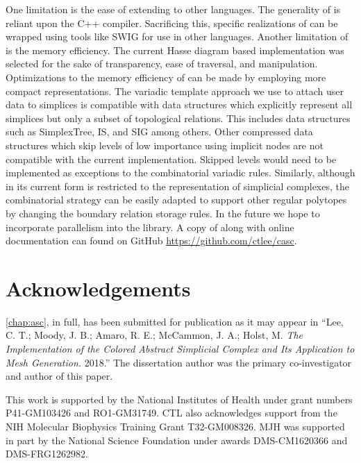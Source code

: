 \par One limitation is the ease of extending to other languages.
The generality of \asc is reliant upon the C++ compiler.
Sacrificing this, specific realizations of \asc can be wrapped using tools like SWIG for use in other languages.
Another limitation of \asc is the memory efficiency.
The current Hasse diagram based implementation was selected for the sake of transparency, ease of traversal, and manipulation.
Optimizations to the memory efficiency of \asc can be made by employing more compact representations.
The variadic template approach we use to attach user data to simplices is compatible with data structures which explicitly represent all simplices but only a subset of topological relations.
This includes data structures such as SimplexTree\cite{Boissonnat2012}, IS\cite{DeFloriani2010b}, and SIG\cite{DeFloriani2004} among others.
Other compressed data structures which skip levels of low importance using implicit nodes are not compatible with the current \asc implementation.
Skipped levels would need to be implemented as exceptions to the combinatorial variadic rules.
Similarly, although \asc in its current form is restricted to the representation of simplicial complexes, the combinatorial strategy can be easily adapted to support other regular polytopes by changing the boundary relation storage rules.
In the future we hope to incorporate parallelism into the \asc library.
A copy of \asc along with online documentation can found on GitHub \url{https://github.com/ctlee/casc}.

\section{Acknowledgements}
\par \cref{chap:asc}, in full, has been submitted for publication as it may appear in
``Lee, C. T.; Moody, J. B.; Amaro, R. E.; McCammon, J. A.; Holst, M. \emph{The Implementation of the Colored Abstract Simplicial Complex and Its Application to Mesh Generation.} 2018.''
The dissertation author was the primary co-investigator and author of this paper.

\par This work is supported by the National Institutes of Health under grant numbers P41-GM103426 and RO1-GM31749.
CTL also acknowledges support from the NIH Molecular Biophysics Training Grant T32-GM008326.
MJH was supported in part by the National Science Foundation under awards DMS-CM1620366 and DMS-FRG1262982.

